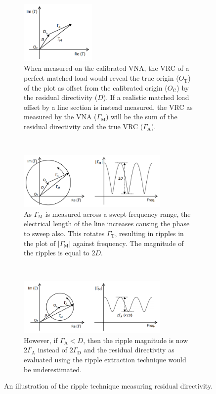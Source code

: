 \documentclass[../thesis/thesis.tex]{subfiles}
\begin{document}
\begin{refsection}
\begin{figure}
	\centering
	\begin{subfigure}{\textwidth}
		\centering
		\includegraphics[width=0.4\textwidth]{Ripple1.png}
		\caption{When measured on the calibrated VNA, the VRC of a perfect matched load would reveal the true origin ($O_\textrm{T}$) of the plot as offset from the calibrated origin ($O_\textrm{C}$) by the residual directivity ($D$). If a realistic matched load offset by a line section is instead measured, the VRC as measured by the VNA ($\Gamma_\textrm{M}$) will be the sum of the residual directivity and the true VRC ($\Gamma_\textrm{A}$). }
	\end{subfigure}
	\\
	\begin{subfigure}{\textwidth}
		\centering
		\includegraphics[width=0.8\textwidth]{Ripple2.png}
		\caption{As $\Gamma_\textrm{M}$ is measured across a swept frequency range, the electrical length of the line increases causing the phase to sweep also. This rotates $\Gamma_\textrm{T}$, resulting in ripples in the plot of $|\Gamma_\textrm{M}|$ against frequency. The magnitude of the ripples is equal to $2D$. }
	\end{subfigure}
	\\
	\begin{subfigure}{\textwidth}
		\centering
		\includegraphics[width=0.8\textwidth]{Ripple3.png}
		\caption{However, if $\Gamma_\textrm{A} < D$, then the ripple magnitude is now $2\Gamma_\textrm{A}$ instead of $2\Gamma_\textrm{D}$ and the residual directivity as evaluated using the ripple extraction technique would be underestimated.}
	\end{subfigure}
	\caption{An illustration of the ripple technique measuring residual directivity.}
	\label{ch4_fig_ripple1}
\end{figure}


\end{refsection}
\end{document}
